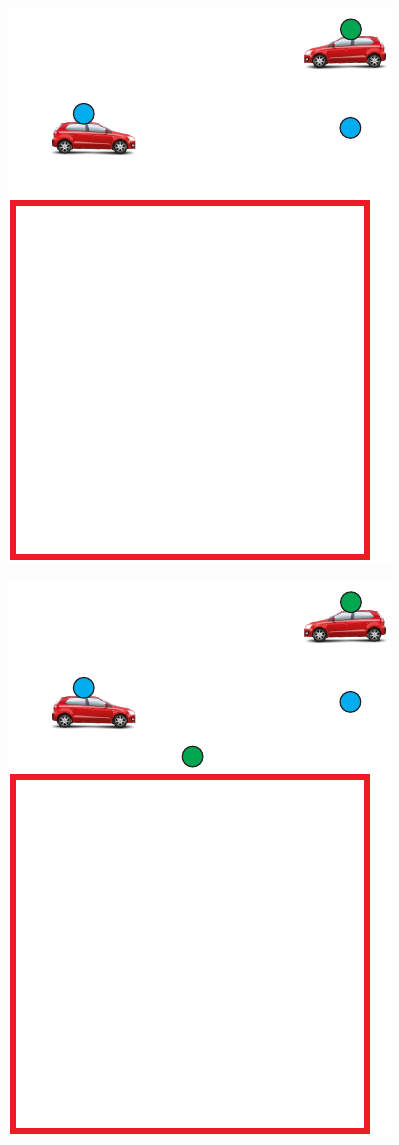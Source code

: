 \begin{figure}[htbp]
\begin{minipage}{0.50\textwidth}
		\includegraphics[scale=0.5]{metodologia/figuras/destinoVeiculoSelecionadoDentroRA.pdf}
		\label{fig:destinoVeiculoSelecionadoDentroRA}
	\end{minipage}
	\begin{minipage}{0.50\textwidth}
		\centering
		\includegraphics[scale=0.5]{metodologia/figuras/destinoVeiculoSelecionadoProximoRA.pdf}

\end{minipage}
\end{figure}
